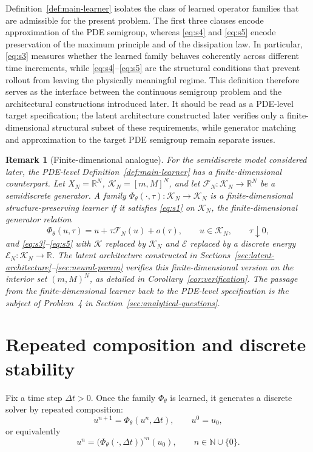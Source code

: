 \documentclass[11pt]{article}
\newtheorem{remark}{Remark}
\newcommand{\N}{\mathbb{N}}
\newcommand{\R}{\mathbb{R}}
\newcommand{\cK}{\mathcal{K}}
\newcommand{\cE}{\mathcal{E}}
\newcommand{\cFN}{\mathcal{F}_N}
\newcommand{\PhiT}{\Phi_{\theta}}
\begin{document}
Definition~\ref{def:main-learner} isolates the class of learned operator families that are admissible for the present problem. The first three clauses encode approximation of the PDE semigroup, whereas \eqref{eq:s4} and \eqref{eq:s5} encode preservation of the maximum principle and of the dissipation law. In particular, \eqref{eq:s3} measures whether the learned family behaves coherently across different time increments, while \eqref{eq:s4}--\eqref{eq:s5} are the structural conditions that prevent rollout from leaving the physically meaningful regime. This definition therefore serves as the interface between the continuous semigroup problem and the architectural constructions introduced later. It should be read as a PDE-level target specification; the latent architecture constructed later verifies only a finite-dimensional structural subset of these requirements, while generator matching and approximation to the target PDE semigroup remain separate issues.

\begin{remark}[Finite-dimensional analogue]\label{rem:finite-dim-def}
For the semidiscrete model considered later, the PDE-level Definition~\ref{def:main-learner} has a finite-dimensional counterpart. Let $X_N=\R^N$, $\cK_N=[m,M]^N$, and let $\cFN:\cK_N\to \R^N$ be a semidiscrete generator. A family $\PhiT(\cdot,\tau):\cK_N\to \cK_N$ is a \emph{finite-dimensional structure-preserving learner} if it satisfies \eqref{eq:s1} on $\cK_N$, the finite-dimensional generator relation
\begin{equation}\label{eq:s2-fd}
\PhiT(u,\tau)=u+\tau\cFN(u)+o(\tau), \qquad u\in \cK_N, \qquad \tau\downarrow 0,
\end{equation}
and \eqref{eq:s3}--\eqref{eq:s5} with $\cK$ replaced by $\cK_N$ and $\cE$ replaced by a discrete energy $\cE_N:\cK_N\to \R$. The latent architecture constructed in Sections~\ref{sec:latent-architecture}--\ref{sec:neural-param} verifies this finite-dimensional version on the interior set $(m,M)^N$, as detailed in Corollary~\ref{cor:verification}. The passage from the finite-dimensional learner back to the PDE-level specification is the subject of Problem~4 in Section~\ref{sec:analytical-questions}.
\end{remark}

\section{Repeated composition and discrete stability}\label{sec:repeated-composition}
Fix a time step \(\Delta t>0\). Once the family \(\PhiT\) is learned, it generates a discrete solver by repeated composition:
\begin{equation}\label{eq:discrete-solver}
u^{n+1}=\PhiT(u^n,\Delta t), \qquad u^0=u_0,
\end{equation}
or equivalently
\begin{equation}\label{eq:iterated-map}
u^n=\bigl(\PhiT(\cdot,\Delta t)\bigr)^{\circ n}(u_0), \qquad n\in \N\cup\{0\}.
\end{equation}
\end{document}

